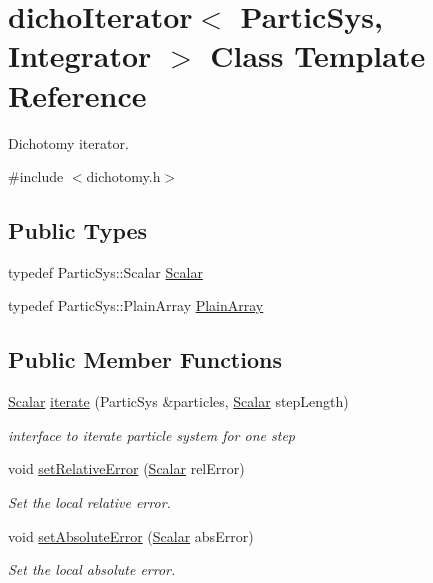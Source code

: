 \hypertarget{classdicho_iterator}{}\section{dicho\+Iterator$<$ Partic\+Sys, Integrator $>$ Class Template Reference}
\label{classdicho_iterator}


Dichotomy iterator.  




{\ttfamily \#include $<$dichotomy.\+h$>$}

\subsection*{Public Types}
\begin{DoxyCompactItemize}
\item 
typedef Partic\+Sys\+::\+Scalar \mbox{\hyperlink{classdicho_iterator_a292e986136313822f21b1b60d9cbb95d}{Scalar}}
\item 
typedef Partic\+Sys\+::\+Plain\+Array \mbox{\hyperlink{classdicho_iterator_ab5b708b3b8a8fbd975c55231052d2547}{Plain\+Array}}
\end{DoxyCompactItemize}
\subsection*{Public Member Functions}
\begin{DoxyCompactItemize}
\item 
\mbox{\hyperlink{classdicho_iterator_a292e986136313822f21b1b60d9cbb95d}{Scalar}} \mbox{\hyperlink{classdicho_iterator_ad341b0652d8fb1530707893ed48a0257}{iterate}} (Partic\+Sys \&particles, \mbox{\hyperlink{classdicho_iterator_a292e986136313822f21b1b60d9cbb95d}{Scalar}} step\+Length)
\begin{DoxyCompactList}\small\item\em interface to iterate particle system for one step \end{DoxyCompactList}\item 
void \mbox{\hyperlink{classdicho_iterator_a2e810ce79342069faafde863d4876ce4}{set\+Relative\+Error}} (\mbox{\hyperlink{classdicho_iterator_a292e986136313822f21b1b60d9cbb95d}{Scalar}} rel\+Error)
\begin{DoxyCompactList}\small\item\em Set the local relative error. \end{DoxyCompactList}\item 
void \mbox{\hyperlink{classdicho_iterator_a95eaed5747897df265b2935a13eee8ca}{set\+Absolute\+Error}} (\mbox{\hyperlink{classdicho_iterator_a292e986136313822f21b1b60d9cbb95d}{Scalar}} abs\+Error)
\begin{DoxyCompactList}\small\item\em Set the local absolute error. \end{DoxyCompactList}\end{DoxyCompactItemize}


